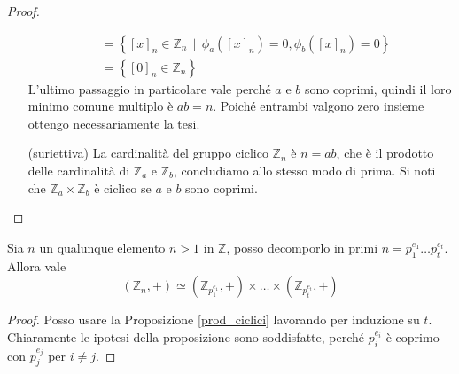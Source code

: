 \begin{proof}
\begin{itemize}
\begin{align*}
		&=\left\{[x]_n\in\mathbb{Z}_n \, \mid \, \phi_a([x]_n)=0,\phi_b([x]_n)=0\right\}\\
		&=\left\{[0]_n\in\mathbb{Z}_n\right\}
		\end{align*}
		L'ultimo passaggio in particolare vale perché $a$ e $b$ sono coprimi, quindi il loro minimo comune multiplo è $ab=n$. Poiché entrambi valgono zero insieme ottengo necessariamente la tesi.
		\item[(suriettiva)] La cardinalità del gruppo ciclico $\mathbb{Z}_n$ è $n=ab$, che è il prodotto delle cardinalità di $\mathbb{Z}_a$ e $\mathbb{Z}_b$, concludiamo allo stesso modo di prima. Si noti che $\mathbb{Z}_a\times \mathbb{Z}_b$ è ciclico se $a$ e $b$ sono coprimi.
	\end{itemize}
\end{proof}
\begin{teorema} Sia $n$ un qualunque elemento $n>1$ in $\mathbb{Z}$, posso decomporlo in primi $n=p_1^{e_1}\dots p_t^{e_t}$.
	Allora vale 
	\begin{equation*}
	(\mathbb{Z}_n,+)\simeq(\mathbb{Z}_{p_1^{e_1}},+)\times\dots\times(\mathbb{Z}_{p_t^{e_t}},+)
	\end{equation*}
\end{teorema}
\begin{proof}
	Posso usare la Proposizione \ref{prod_ciclici} lavorando per induzione su $t$. Chiaramente le ipotesi della proposizione sono soddisfatte, perché ${p_i^{e_i}}$ è coprimo con ${p_j^{e_j}}$ per $i\neq j$.
\end{proof}




